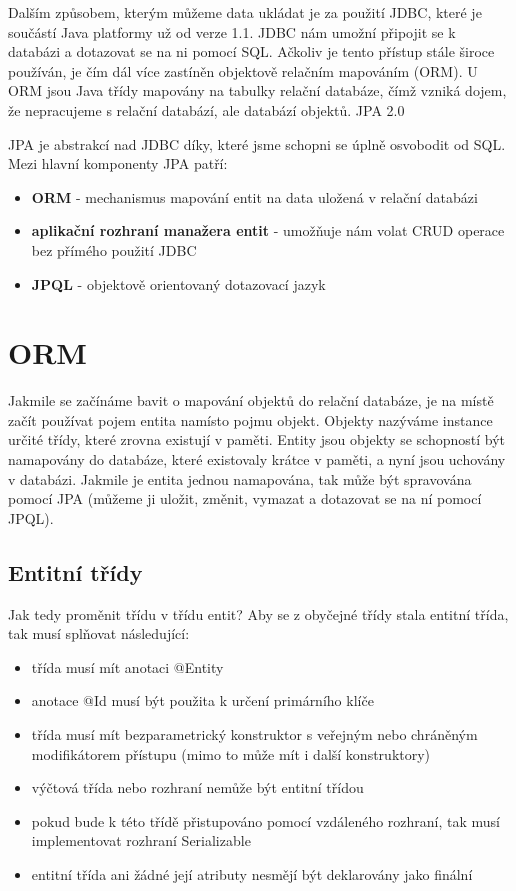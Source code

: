 \documentclass[122pt,oneside]{fithesis}
\begin{document}
Dalším způsobem, kterým můžeme data ukládat je za použití JDBC, které je součástí Java platformy už od verze 1.1. JDBC nám umožní připojit se k databázi a dotazovat se na ni pomocí SQL. Ačkoliv je tento přístup stále široce používán, je čím dál více zastíněn objektově relačním mapováním (ORM). U ORM jsou Java třídy mapovány na tabulky relační databáze, čímž vzniká dojem, že nepracujeme s relační databází, ale databází objektů.
JPA 2.0

JPA je abstrakcí nad JDBC díky, které jsme schopni se úplně osvobodit od SQL. Mezi hlavní komponenty JPA patří:

\begin{itemize}
  \item{\bf ORM} - mechanismus mapování entit na data uložená v relační databázi 
  \item{\bf aplikační rozhraní manažera entit} - umožňuje nám volat CRUD operace bez přímého použití JDBC
  \item{\bf JPQL} - objektově orientovaný dotazovací jazyk
\end{itemize}

\section{ORM}
Jakmile se začínáme bavit o mapování objektů do relační databáze, je na místě začít používat pojem entita namísto pojmu objekt. Objekty nazýváme instance určité třídy, které zrovna existují v paměti. Entity jsou objekty se schopností být namapovány do databáze, které existovaly krátce v paměti, a nyní jsou uchovány v databázi. Jakmile je entita jednou namapována, tak může být spravována pomocí JPA (můžeme ji uložit, změnit, vymazat a dotazovat se na ní pomocí JPQL).

\subsection{Entitní třídy}
Jak tedy proměnit třídu v třídu entit? Aby se z obyčejné třídy stala entitní třída, tak musí splňovat následující:
\begin{itemize}
  \item třída musí mít anotaci @Entity
  \item anotace @Id musí být použita k určení primárního klíče
  \item třída musí mít bezparametrický konstruktor s veřejným nebo chráněným modifikátorem přístupu (mimo to může mít i další konstruktory)
  \item výčtová třída nebo rozhraní nemůže být entitní třídou
  \item pokud bude k této třídě přistupováno pomocí vzdáleného rozhraní, tak musí implementovat rozhraní Serializable
  \item entitní třída ani žádné její atributy nesmějí být deklarovány jako finální
\end{itemize}
\end{document}
